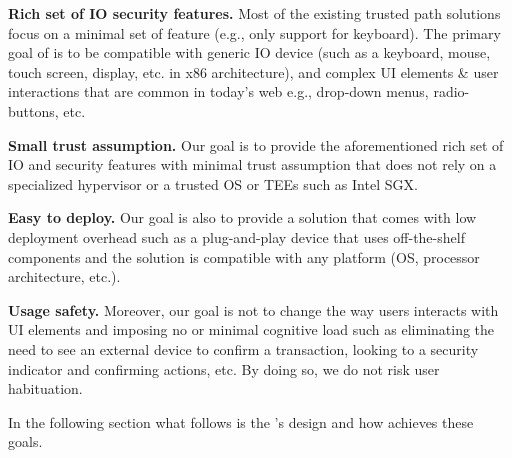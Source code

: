 \begin{mylist}
  \item  \textbf{Rich set of IO security features.} Most of the existing trusted path solutions focus on a minimal set of feature (e.g., only support for keyboard). The primary goal of \name is to be compatible with generic IO device (such as a keyboard, mouse, touch screen, display, etc. in x86 architecture), and complex UI elements \& user interactions that are common in today's web e.g., drop-down menus, radio-buttons, etc. 
  
  \item  \textbf{Small trust assumption.} Our goal is to provide the aforementioned rich set of IO and security features with minimal trust assumption that does not rely on a specialized hypervisor or a trusted OS  or TEEs such as Intel SGX. %
  
  \item \textbf{Easy to deploy.} Our goal is also to provide a solution that comes with low deployment overhead such as a plug-and-play device that uses off-the-shelf components and the solution is compatible with any platform (OS, processor architecture, etc.). 
  
  \item \textbf{Usage safety.} Moreover, our goal is not to change the way users interacts with UI elements and imposing no or minimal cognitive load such as eliminating the need to see an external device to confirm a transaction, looking to a security indicator and confirming actions, etc. By doing so, we do not risk user habituation. 

\end{mylist}

In the following section what follows is the \name's design and how \name achieves these goals.
